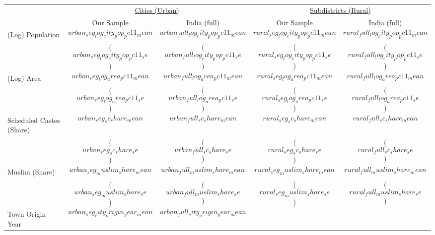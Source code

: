 {
  \def\sym#1{\ifmmode^{#1}\else\(^{#1}\)\fi}
\begin{tabular}{lcccc}
  \hline\hline
                             & \multicolumn{2}{c}{\underline{Cities (Urban)}} & \multicolumn{2}{c}{\underline{Subdistricts (Rural)}}      \\
                             & \multicolumn{1}{c}{Our Sample}        & \multicolumn{1}{c}{India (full)}      & \multicolumn{1}{c}{Our Sample}       & \multicolumn{1}{c}{India (full)}      \\
  \hline
(Log) Population             & $$urban_seg_log_city_pop_pc11_mean$$  & $$urban_full_log_city_pop_pc11_mean$$ & $$rural_seg_log_city_pop_pc11_mean$$ & $$rural_full_log_city_pop_pc11_mean$$ \\
                             & ($$urban_seg_log_city_pop_pc11_se$$)  & ($$urban_full_log_city_pop_pc11_se$$) & ($$rural_seg_log_city_pop_pc11_se$$) & ($$rural_full_log_city_pop_pc11_se$$) \\
(Log) Area                   & $$urban_seg_log_area_pc11_mean$$      & $$urban_full_log_area_pc11_mean$$     & $$rural_seg_log_area_pc11_mean$$     & $$rural_full_log_area_pc11_mean$$     \\
                             & ($$urban_seg_log_area_pc11_se$$)      & ($$urban_full_log_area_pc11_se$$)     & ($$rural_seg_log_area_pc11_se$$)     & ($$rural_full_log_area_pc11_se$$)     \\
Scheduled Castes (Share)     & $$urban_seg_sc_share_mean$$           & $$urban_full_sc_share_mean$$          & $$rural_seg_sc_share_mean$$          & $$rural_full_sc_share_mean$$          \\
                             & ($$urban_seg_sc_share_se$$)           & ($$urban_full_sc_share_se$$)          & ($$rural_seg_sc_share_se$$)          & ($$rural_full_sc_share_se$$)          \\ 
Muslim (Share)               & $$urban_seg_muslim_share_mean$$       & $$urban_full_muslim_share_mean$$      & $$rural_seg_muslim_share_mean$$      & $$rural_full_muslim_share_mean$$      \\
                             & ($$urban_seg_muslim_share_se$$)       & ($$urban_full_muslim_share_se$$)      & ($$rural_seg_muslim_share_se$$)      & ($$rural_full_muslim_share_se$$)      \\
Town Origin Year             & $$urban_seg_city_origin_year_mean$$   & $$urban_full_city_origin_year_mean$$  &                                      &                                       \\

\end{tabular}}
